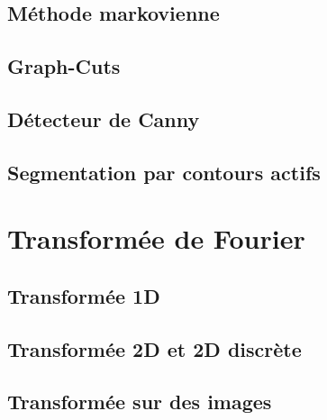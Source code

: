 \documentclass[french]{article}
\begin{document}
\subsection{Méthode markovienne}
\subsection{Graph-Cuts}
\subsection{Détecteur de Canny}
\subsection{Segmentation par contours actifs}

\section{Transformée de Fourier}
\subsection{Transformée 1D}
\subsection{Transformée 2D et 2D discrète}
\subsection{Transformée sur des images}
\end{document}
